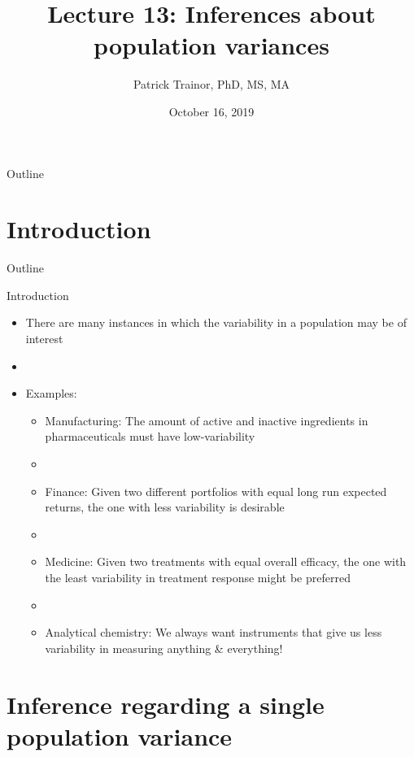 \documentclass[xcolor=dvipsnames]{beamer}
\title[Lecture 13]{Lecture 13: Inferences about population variances}
\author[Patrick Trainor]{Patrick Trainor, PhD, MS, MA}
\institute[NMSU]{New Mexico State University}
\date{October 16, 2019}
\begin{document}
	
\begin{frame}
	\maketitle
\end{frame}

\begin{frame}{Outline}
	\tableofcontents[hideallsubsections]
\end{frame}

\section{Introduction}

\begin{frame}{Outline}
	\tableofcontents[currentsection,subsectionstyle=show/shaded/hide]
\end{frame}

\begin{frame}{Introduction}
	\begin{itemize}
		\item There are many instances in which the variability in a population may be of interest \pause
		\item[]
		\item Examples: \pause
		\begin{itemize}
			\item Manufacturing: The amount of active and inactive ingredients in pharmaceuticals must have low-variability \pause
			\item[]
			\item Finance: Given two different portfolios with equal long run expected returns, the one with less variability is desirable \pause
			\item[]
			\item Medicine: Given two treatments with equal overall efficacy, the one with the least variability in treatment response might be preferred \pause
			\item[]
			\item Analytical chemistry: We always want instruments that give us less variability in measuring anything \& everything!
		\end{itemize}
	\end{itemize}
\end{frame}

\section{Inference regarding a single population variance}
\end{document}
